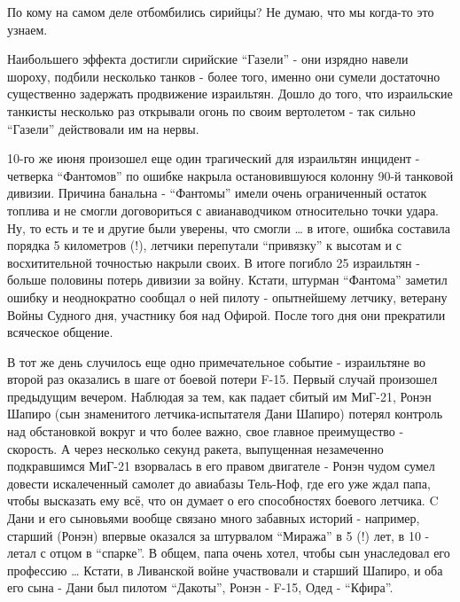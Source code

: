 По кому на самом деле отбомбились сирийцы? Не думаю, что мы когда-то это узнаем.

Наибольшего эффекта достигли сирийские “Газели” - они изрядно навели шороху, подбили несколько танков - более того, именно они сумели достаточно существенно задержать продвижение израильтян. Дошло до того, что израильские танкисты несколько раз открывали огонь по своим вертолетом - так сильно “Газели” действовали им на нервы.

10-го же июня произошел еще один трагический для израильтян инцидент - четверка “Фантомов” по ошибке накрыла остановившуюся колонну 90-й танковой дивизии. Причина банальна - “Фантомы” имели очень ограниченный остаток топлива и не смогли договориться с авианаводчиком относительно точки удара. Ну, то есть и те и другие были уверены, что смогли … в итоге, ошибка составила порядка 5 километров (!), летчики перепутали “привязку” к высотам и с восхитительной точностью накрыли своих. В итоге погибло 25 израильтян - больше половины потерь дивизии за войну. Кстати, штурман “Фантома” заметил ошибку и неоднократно сообщал о ней пилоту - опытнейшему летчику, ветерану Войны Судного дня, участнику боя над Офирой. После того дня они прекратили всяческое общение.

В тот же день случилось еще одно примечательное событие - израильтяне во второй раз оказались в шаге от боевой потери F-15. Первый случай произошел предыдущим вечером. Наблюдая за тем, как падает сбитый им МиГ-21, Ронэн Шапиро (сын знаменитого летчика-испытателя Дани Шапиро) потерял контроль над обстановкой вокруг и что более важно, свое главное преимущество - скорость. А через несколько секунд ракета, выпущенная незамеченно подкравшимся МиГ-21 взорвалась в его правом двигателе - Ронэн чудом сумел довести искалеченный самолет до авиабазы Тель-Ноф, где его уже ждал папа, чтобы высказать ему всё, что он думает о его способностях боевого летчика. C Дани и его сыновьями вообще связано много забавных историй - например, старший (Ронэн) впервые оказался за штурвалом “Миража” в 5 (!) лет, в 10 - летал с отцом в “спарке”. В общем, папа очень хотел, чтобы сын унаследовал его профессию … Кстати, в Ливанской войне участвовали и старший Шапиро, и оба его сына - Дани был пилотом “Дакоты”, Ронэн - F-15, Одед - “Кфира”.

